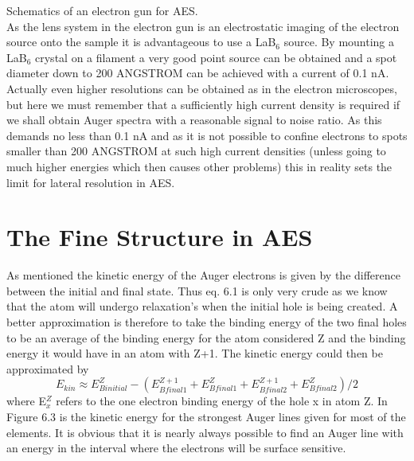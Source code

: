           \vspace{12cm}

           Schematics of an electron gun for
          AES.\\

          As the lens system in the electron gun is  an  electrostatic
          imaging of  the  electron  source  onto  the  sample  it  is
          advantageous to  use  a  LaB$_{6}$  source.  By  mounting  a
          LaB$_{6}$ crystal on a filament a very good point source can
          be obtained and a  spot  diameter  down  to  200  ANGSTROM  can  be
          achieved with a current of  0.1  nA.  Actually  even  higher
          resolutions can be obtained as in the  electron  microscopes,
          but here we must remember that  a  sufficiently  high  current
          density is required if we shall obtain Auger spectra with a
          reasonable signal to noise ratio. As this  demands  no  less
          than 0.1 nA and as it is not possible to  confine  electrons
          to spots smaller than 200 ANGSTROM at such high  current  densities
          (unless going to much higher energies which then causes other
          problems)  this  in  reality  sets  the  limit  for  lateral
          resolution in AES.



          \section{The Fine Structure in AES}






          As mentioned the kinetic energy of the Auger  electrons  is
          given by the difference between the initial and final state.
          Thus  eq. 6.1 is only very crude as we know that the atom
          will undergo relaxation's when  the  initial  hole  is  being
          created. A better approximation  is  therefore  to  take  the
          binding energy of the two final holes to be  an  average  of
          the binding energy for the atom considered Z and the binding
          energy it would have in  an  atom  with  Z+1.  The  kinetic
          energy could then be approximated by
\begin{equation}
          E_{kin}  \approx  E_{B  initial}^{Z}  -
          (E_{B    final1}^{Z+1}+E_{B    final    1}^{Z}     +     E_{B
          final2}^{Z+1}+E_{B final 2}^{Z})/2
           \end{equation} where E$_{x}^{Z}$
          refers to the  one  electron  binding  energy  of  the  hole
          x in atom Z.
          In Figure 6.3 is the kinetic energy for the strongest Auger
          lines given for most of the elements. It is obvious that  it
          is nearly always possible to find  an  Auger  line  with  an
          energy in the interval where the electrons will  be  surface
                         sensitive.\\




